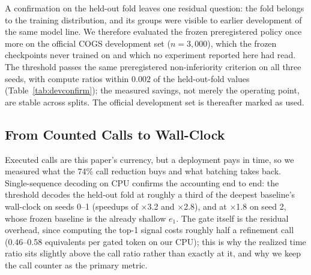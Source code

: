 ﻿\documentclass[11pt]{article}
\begin{document}
A confirmation on the held-out fold leaves one residual question: the fold belongs to the training distribution, and its groups were visible to earlier development of the same model line. We therefore evaluated the frozen preregistered policy once more on the official COGS development set ($n{=}3{,}000$), which the frozen checkpoints never trained on and which no experiment reported here had read. The threshold passes the same preregistered non-inferiority criterion on all three seeds, with compute ratios within $0.002$ of the held-out-fold values (Table~\ref{tab:devconfirm}); the measured savings, not merely the operating point, are stable across splits. The official development set is thereafter marked as used.

\begin{table}[t]
\centering
\footnotesize
\setlength{\tabcolsep}{2.5pt}
\caption{\textbf{One-shot confirmation on untouched data.} Official COGS development set ($n{=}3{,}000$; group-cluster paired bootstrap, 20{,}000 resamples), evaluated once with the frozen preregistered threshold and each seed's frozen best fixed depth. The compute ratios match the held-out-fold values (0.2575 / 0.2570 / 0.5212) to the third decimal, so the executed-call savings themselves transfer across splits.}
\label{tab:devconfirm}
\end{table}

\subsection{From Counted Calls to Wall-Clock}
\label{sec:exp-wall}
Executed calls are this paper's currency, but a deployment pays in time, so we measured what the 74\% call reduction buys and what batching takes back. Single-sequence decoding on CPU confirms the accounting end to end: the threshold decodes the held-out fold at roughly a third of the deepest baseline's wall-clock on seeds 0--1 (speedups of $\times$3.2 and $\times$2.8), and at $\times$1.8 on seed 2, whose frozen baseline is the already shallow $e_1$. The gate itself is the residual overhead, since computing the top-1 signal costs roughly half a refinement call (0.46--0.58 equivalents per gated token on our CPU); this is why the realized time ratio sits slightly above the call ratio rather than exactly at it, and why we keep the call counter as the primary metric.
\end{document}
